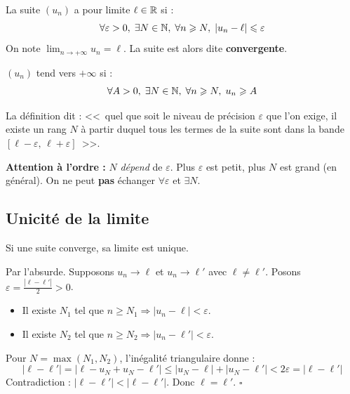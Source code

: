 \begin{defbox}
La suite $(u_n)$ a pour limite $\ell \in \mathbb{R}$ si :
\[
  \forall \varepsilon > 0,\; \exists N \in \mathbb{N},\; \forall n \geqslant N,\; |u_n - \ell| \leqslant \varepsilon
\]
On note $\displaystyle\lim_{n \to +\infty} u_n = \ell$. La suite est alors dite \textbf{convergente}.
\end{defbox}

\begin{defbox}
$(u_n)$ tend vers $+\infty$ si :
\[
  \forall A > 0,\; \exists N \in \mathbb{N},\; \forall n \geqslant N,\; u_n \geqslant A
\]
\end{defbox}

\begin{intuitionbox}
La définition dit : <<~quel que soit le niveau de précision $\varepsilon$ que l'on exige, il existe un rang $N$ à partir duquel tous les termes de la suite sont dans la bande $[\ell - \varepsilon,\, \ell + \varepsilon]$~>>.

\textbf{Attention à l'ordre :} $N$ \emph{dépend} de $\varepsilon$. Plus $\varepsilon$ est petit, plus $N$ est grand (en général). On ne peut \textbf{pas} échanger $\forall \varepsilon$ et $\exists N$.
\end{intuitionbox}

\subsection{Unicité de la limite}

\begin{propbox}[--- Unicité]
Si une suite converge, sa limite est unique.
\end{propbox}

\begin{proofbox}
Par l'absurde. Supposons $u_n \to \ell$ et $u_n \to \ell'$ avec $\ell \neq \ell'$. Posons $\varepsilon = \frac{|\ell - \ell'|}{2} > 0$.
\begin{itemize}[leftmargin=1cm]
  \item Il existe $N_1$ tel que $n \geqslant N_1 \Rightarrow |u_n - \ell| < \varepsilon$.
  \item Il existe $N_2$ tel que $n \geqslant N_2 \Rightarrow |u_n - \ell'| < \varepsilon$.
\end{itemize}
Pour $N = \max(N_1, N_2)$, l'inégalité triangulaire donne :
\[
  |\ell - \ell'| = |\ell - u_N + u_N - \ell'| \leqslant |u_N - \ell| + |u_N - \ell'| < 2\varepsilon = |\ell - \ell'|
\]
Contradiction : $|\ell - \ell'| < |\ell - \ell'|$. Donc $\ell = \ell'$. \hfill$\square$
\end{proofbox}

